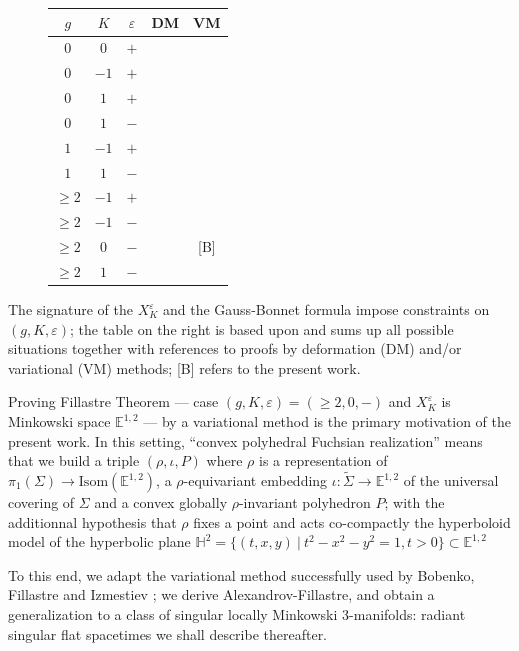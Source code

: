 \documentclass[a4paper,12pt]{article}
\def\H{\mathbb{H}}
\def\E{\mathbf E}
\def\E{\mathbb{E}}
\newcommand{\mass}[1]{{\mathbb E}^{1,2}_{#1}}
\def\E{\mathbb{E}}
\theoremstyle{definition}
\begin{document}
    \begin{figure}
		 \begin{tabular}{|c|c|c|c|c|}\hline
			$g$	&$K$	&$\varepsilon$	& DM & VM \\ \hline
			$0$	&$0$	&$+$&\cite{MR13540}&\cite{MR2410380} \\
			$0$	&$-1$	&$+$&\cite{MR2127379}& \\
			$0$	&$1$	&$+$&\cite{MR2127379}& \\
			$0$	&$1$	&$-$&\cite{Hodgson1993}& \\ \hline
			$1$	&$-1$	&$+$&&\cite{MR2469522}\\
			$1$	&$1$	&$-$&& \cite{MR2813423}\\
			\hline
			$\geq2$&$-1$&$+$&\cite{MR2313089}& \\
			$\geq2$&$-1$&$-$&\cite{MR2794916}& \\
			$\geq2$&$0$	&$-$&\cite{MR2794916}& [B] \\
			$\geq2$&$1$	&$-$&\cite{Schlenker2001hyperbolic}& \\ \hline
		 \end{tabular}
		\end{figure}
		The signature of the $X_K^{\varepsilon}$ and the Gauss-Bonnet formula impose  constraints on $(g,K,\varepsilon)$; the table on the right is based upon \cite{fillastre:hal-00535675} and sums up all possible situations
together with references to proofs by deformation (DM) and/or variational (VM) methods; [B] refers to the present work.
		
    
    Proving Fillastre Theorem --- case $(g,K,\varepsilon)=(\geq2,0,-)$ and $X_K^\varepsilon$ is Minkowski space $ \E^{1,2}$ --- by a variational method is the primary motivation of the present work. In this setting, ``convex polyhedral Fuchsian realization'' means that we build a triple $(\rho,\iota,P)$ where $\rho$ is a representation of $\pi_1(\Sigma)\rightarrow \mathrm{Isom}(\mass{})$, a $\rho$-equivariant embedding $\iota:\widetilde\Sigma\rightarrow \mass{}$ of the universal covering  of $\Sigma$ and a convex globally $\rho$-invariant polyhedron $P$; with the additionnal hypothesis that $\rho$ fixes a point and acts co-compactly the hyperboloid model of the hyperbolic plane $\H^2=\{(t,x,y)~|~t^2-x^2-y^2=1,t>0\}\subset \mass{}$  

	To this end, we adapt the variational method successfully used by Bobenko, Fillastre and Izmestiev \cite{MR2410380,MR2469522,MR2813423}; we derive Alexandrov-Fillastre, and obtain a generalization to a class of singular locally Minkowski 3-manifolds: radiant singular flat spacetimes we shall describe thereafter. 
	
\end{document}
